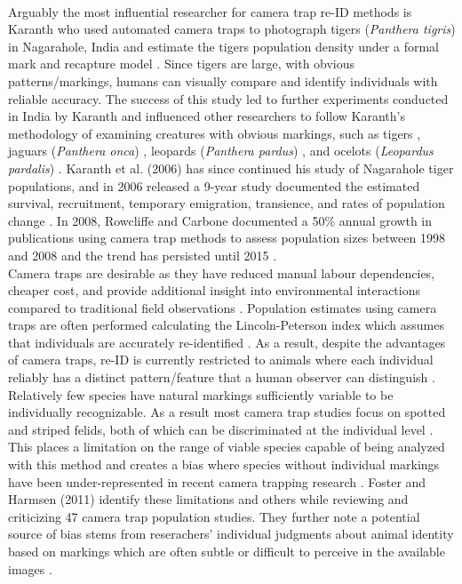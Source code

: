 \documentclass[11pt]{article}
\begin{document}
\newline
\\
Arguably the most influential researcher for camera trap re-ID methods is Karanth who used automated camera traps to photograph tigers (\textit{Panthera tigris}) in Nagarahole, India and estimate the tigers population density under a formal mark and recapture model \cite{karanth1995estimating, kucera2011history}. Since tigers are large, with obvious patterns/markings, humans can visually compare and identify individuals with reliable accuracy. The success of this study led to further experiments conducted in India by Karanth \cite{karanth1998estimation, karanth2004estimation} and influenced other researchers to follow Karanth's methodology of examining creatures with obvious markings, such as tigers \cite{o2003crouching, kawanishi2004conservation}, jaguars (\textit{Panthera onca}) \cite{silver2004assessing, silver2004use}, leopards (\textit{Panthera pardus}) \cite{henschel2003leopards}, and ocelots (\textit{Leopardus pardalis}) \cite{maffei2005ocelot, trolle2005camera}. Karanth et al. (2006) has since continued his study of Nagarahole tiger populations, and in 2006 released a 9-year study documented the estimated survival, recruitment, temporary emigration, transience, and rates of population change \cite{karanth2006assessing}. In 2008, Rowcliffe and Carbone documented a 50\% annual growth in publications using camera trap methods to assess population sizes between 1998 and 2008 and the trend has persisted until 2015 \cite{rowcliffe2008estimating, burton2015wildlife}. 
\newline
\\
Camera traps are desirable as they have reduced manual labour dependencies, cheaper cost, and provide additional insight into environmental interactions compared to traditional field observations \cite{henschel2003leopards, silveira2003camera, wegge2004effects}. Population estimates using camera traps are often performed calculating the Lincoln-Peterson index which assumes that individuals are accurately re-identified \cite{southwood2009ecological}. As a result, despite the advantages of camera traps, re-ID is currently restricted to animals where each individual reliably has a distinct pattern/feature that a human observer can distinguish \cite{trolle2005camera}. Relatively few species have natural markings sufficiently variable to be individually recognizable. As a result most camera trap studies focus on spotted and striped felids, both of which can be discriminated at the individual level \cite{karanth1998estimation, henschel2003leopards, maffei2005ocelot}. This places a limitation on the range of viable species capable of being analyzed with this method and creates a bias where species without individual markings have been under-represented in recent camera trapping research \cite{trolle2003mammal, srbek2005camera}. Foster and Harmsen (2011) identify these limitations and others while reviewing and criticizing 47 camera trap population studies. They further note a potential source of bias stems from reserachers’ individual judgments about animal identity based on markings which are often subtle or difficult to perceive in the available images \cite{foster2012critique}.
\end{document}
